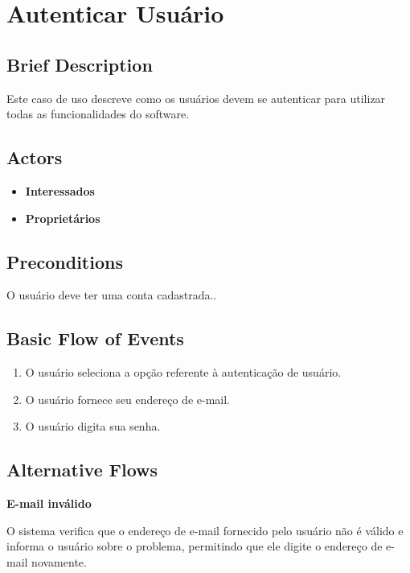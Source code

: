 \section{Autenticar Usuário}

\subsection*{Brief Description}

Este caso de uso descreve como os usuários devem se autenticar para utilizar todas
as funcionalidades do software.

\subsection*{Actors}


\begin{itemize}
    \item \textbf{Interessados}
    \item \textbf{Proprietários}
\end{itemize}

\subsection*{Preconditions}
 
O usuário deve ter uma conta cadastrada..

\subsection*{Basic Flow of Events}

\begin{enumerate}
    \item O usuário seleciona a opção referente à autenticação de usuário.
    \item O usuário fornece seu endereço de e-mail.
    \item O usuário digita sua senha.
\end{enumerate}

\subsection*{Alternative Flows}

\textbf{E-mail inválido}

O sistema verifica que o endereço de e-mail fornecido pelo usuário não é válido e informa o usuário
sobre o problema, permitindo que ele digite o endereço de e-mail novamente.

